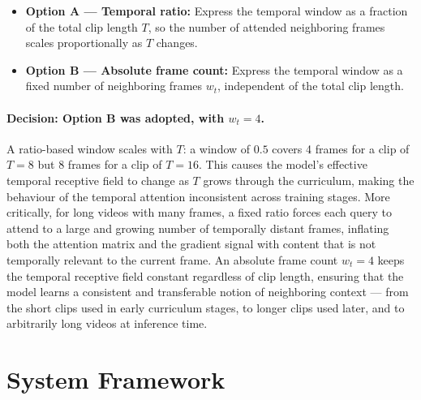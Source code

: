 \begin{itemize}
    \item \textbf{Option A --- Temporal ratio:} Express the temporal window as a 
    fraction of the total clip length $T$, so the number of attended neighboring 
    frames scales proportionally as $T$ changes.
    \item \textbf{Option B --- Absolute frame count:} Express the temporal window 
    as a fixed number of neighboring frames $w_t$, independent of the total clip 
    length.
\end{itemize}

\paragraph{Decision: Option B was adopted, with $w_t = 4$.}
A ratio-based window scales with $T$: a window of $0.5$ covers 4 frames for a 
clip of $T = 8$ but 8 frames for a clip of $T = 16$. This causes the model's 
effective temporal receptive field to change as $T$ grows through the curriculum, 
making the behaviour of the temporal attention inconsistent across training stages. 
More critically, for long videos with many frames, a fixed ratio forces each query 
to attend to a large and growing number of temporally distant frames, inflating 
both the attention matrix and the gradient signal with content that is not 
temporally relevant to the current frame. An absolute frame count $w_t = 4$ keeps 
the temporal receptive field constant regardless of clip length, ensuring that the 
model learns a consistent and transferable notion of neighboring context --- from 
the short clips used in early curriculum stages, to longer clips used later, and 
to arbitrarily long videos at inference time.

\section{System Framework}

